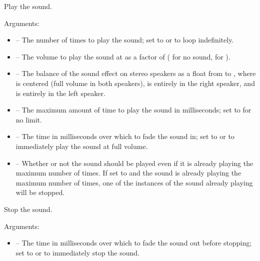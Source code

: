 \documentclass[letterpaper,10pt,english]{sphinxmanual}
\begin{document}
\begin{fulllineitems}
\label{snd:sge.snd.Sound.play}
Play the sound.

Arguments:
\begin{itemize}
\item {} 
 -- The number of times to play the sound; set to
 or  to loop indefinitely.

\item {} 
 -- The volume to play the sound at as a factor
of  ( for no sound,  for
).

\item {} 
 -- The balance of the sound effect on stereo
speakers as a float from  to , where  is
centered (full volume in both speakers),  is entirely in
the right speaker, and  is entirely in the left speaker.

\item {} 
 -- The maximum amount of time to play the sound in
milliseconds; set to  for no limit.

\item {} 
 -- The time in milliseconds over which to fade
the sound in; set to  or  to immediately
play the sound at full volume.

\item {} 
 -- Whether or not the sound should be played even if
it is already playing the maximum number of times.  If set to
 and the sound is already playing the maximum
number of times, one of the instances of the sound already
playing will be stopped.

\end{itemize}

\end{fulllineitems}


\begin{fulllineitems}
\label{snd:sge.snd.Sound.stop}
Stop the sound.

Arguments:
\begin{itemize}
\item {} 
 -- The time in milliseconds over which to fade
the sound out before stopping; set to  or 
to immediately stop the sound.

\end{itemize}

\end{fulllineitems}
\end{document}
